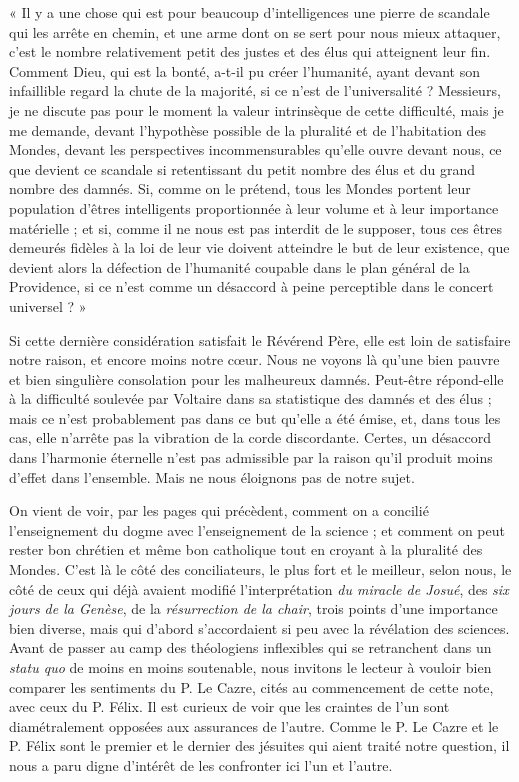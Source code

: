 \documentclass[a4paper, 11pt, oneside, landscape]{article}
\begin{document}
« Il y a une chose qui est pour beaucoup d'intelligences une pierre de scandale qui les arrête en chemin, et une arme dont on se sert pour nous mieux attaquer, c'est le nombre relativement petit des justes et des élus qui atteignent leur fin. Comment Dieu, qui est la bonté, a-t-il pu créer l'humanité, ayant devant son infaillible regard la chute de la majorité, si ce n'est de l'universalité ? Messieurs, je ne discute pas pour le moment la valeur intrinsèque de cette difficulté, mais je me demande, devant l'hypothèse possible de la pluralité et de l'habitation des Mondes, devant les perspectives incommensurables qu'elle ouvre devant nous, ce que devient ce scandale si retentissant du petit nombre des élus et du grand nombre des damnés. Si, comme on le prétend, tous les Mondes portent leur population d'êtres intelligents proportionnée à leur volume et à leur importance matérielle ; et si, comme il ne nous est pas interdit de le supposer, tous ces êtres demeurés fidèles à la loi de leur vie doivent atteindre le but de leur existence, que devient alors la défection de l'humanité coupable dans le plan général de la Providence, si ce n'est comme un désaccord à peine perceptible dans le concert universel ? »

Si cette dernière considération satisfait le Révérend Père, elle est loin de satisfaire notre raison, et encore moins notre cœur. Nous ne voyons là qu'une bien pauvre et bien singulière consolation pour les malheureux damnés. Peut-être répond-elle à la difficulté soulevée par Voltaire dans sa statistique des damnés et des élus ; mais ce n'est probablement pas dans ce but qu'elle a été émise, et, dans tous les cas, elle n'arrête pas la vibration de la corde discordante. Certes, un désaccord dans l'harmonie éternelle n'est pas admissible par la raison qu'il produit moins d'effet dans l'ensemble. Mais ne nous éloignons pas de notre sujet.

On vient de voir, par les pages qui précèdent, comment on a concilié l'enseignement du dogme avec l'enseignement de la science ; et comment on peut rester bon chrétien et même bon catholique tout en croyant à la pluralité des Mondes. C'est là le côté des conciliateurs, le plus fort et le meilleur, selon nous, le côté de ceux qui déjà avaient modifié l'interprétation \emph{du miracle de Josué}, des \emph{six jours de la Genèse}, de la \emph{résurrection de la chair}, trois points d'une importance bien diverse, mais qui d'abord s'accordaient si peu avec la révélation des sciences. Avant de passer au camp des théologiens inflexibles qui se retranchent dans un \emph{statu quo} de moins en moins soutenable, nous invitons le lecteur à vouloir bien comparer les sentiments du P. Le Cazre, cités au commencement de cette note, avec ceux du P. Félix. Il est curieux de voir que les craintes de l'un sont diamétralement opposées aux assurances de l'autre. Comme le P. Le Cazre et le P. Félix sont le premier et le dernier des jésuites qui aient traité notre question, il nous a paru digne d'intérêt de les confronter ici l'un et l'autre.
\end{document}
